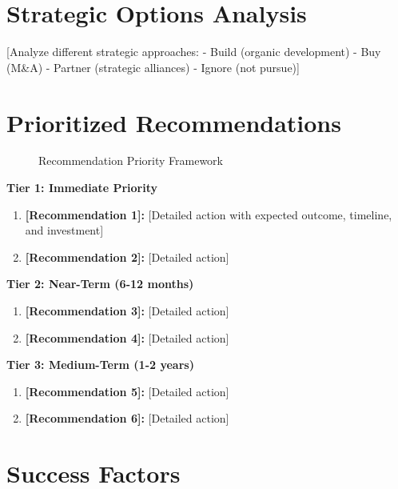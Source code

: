 \documentclass[11pt,letterpaper]{report}
\begin{document}
\section{Strategic Options Analysis}

[Analyze different strategic approaches:
- Build (organic development)
- Buy (M\&A)
- Partner (strategic alliances)
- Ignore (not pursue)]

\section{Prioritized Recommendations}


\begin{figure}[htbp]
\centering
\caption{Recommendation Priority Framework}
\label{fig:recommendations}
\end{figure}

\begin{recommendationbox}
\textbf{Tier 1: Immediate Priority}
\begin{enumerate}
    \item \textbf{[Recommendation 1]:} [Detailed action with expected outcome, timeline, and investment]
    \item \textbf{[Recommendation 2]:} [Detailed action]
\end{enumerate}

\textbf{Tier 2: Near-Term (6-12 months)}
\begin{enumerate}[start=3]
    \item \textbf{[Recommendation 3]:} [Detailed action]
    \item \textbf{[Recommendation 4]:} [Detailed action]
\end{enumerate}

\textbf{Tier 3: Medium-Term (1-2 years)}
\begin{enumerate}[start=5]
    \item \textbf{[Recommendation 5]:} [Detailed action]
    \item \textbf{[Recommendation 6]:} [Detailed action]
\end{enumerate}
\end{recommendationbox}

\section{Success Factors}
\end{document}
